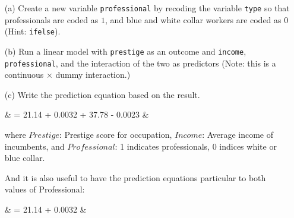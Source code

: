 \documentclass[12pt,letterpaper]{article}
\begin{document}
\newpage
\begin{enumerate}
	
	\item [(a)]
	Create a new variable \texttt{professional} by recoding the variable \texttt{type} so that professionals are coded as $1$, and blue and white collar workers are coded as $0$ (Hint: \texttt{ifelse}).
	\vspace{0.5cm}
	
	 
	\vspace{0.5cm}
	
	\item [(b)]
	Run a linear model with \texttt{prestige} as an outcome and \texttt{income}, \texttt{professional}, and the interaction of the two as predictors (Note: this is a continuous $\times$ dummy interaction.)
	\vspace{0.5cm}
		
	 
	\vspace{0.5cm}
	
	\item [(c)]
	Write the prediction equation based on the result.
	\vspace{0.5cm}
	
	{\setlength{\abovedisplayskip}{2pt} 
		\setlength{\belowdisplayskip}{6pt} 
		
		\begin{flalign*}
			& = 21.14 + 0.0032 \cdot {} + 37.78 \cdot {} - 0.0023 \cdot {} \cdot {} &
		\end{flalign*}
		
		where $Prestige$: Prestige score for occupation, $Income$: Average income of incumbents, and $Professional$: 1 indicates professionals, 0 indices white or blue collar.  
	} 
	
	And it is also useful to have the prediction equations particular to both values of Professional: 
	
	{\setlength{\abovedisplayskip}{2pt} 
		\setlength{\belowdisplayskip}{6pt} 
		
		\begin{flalign*}
			&  = 21.14 + 0.0032 \cdot \text{Income} &
		\end{flalign*}
	} 

		{\setlength{\abovedisplayskip}{2pt} 
		\setlength{\belowdisplayskip}{6pt} 
		
}
\end{enumerate}
\end{document}
